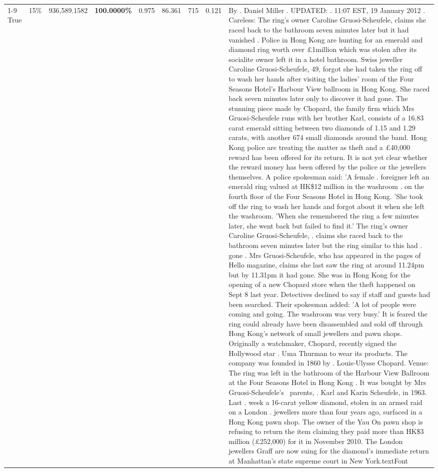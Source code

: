 \begin{table}[H]
\begin{tabular}{lllrlllll}
\cline{1-9} \cline{2-9}
True & 15\% & 936,589.1582 & \bfseries \color{red} 100.0000\% & 0.975 & 86.361 & 715 & 0.121 & By . Daniel Miller . UPDATED: . 11:07 EST, 19 January 2012 . Careless: The ring's owner Caroline Gruosi-Scheufele, claims she raced back to the bathroom seven minutes later but it had vanished . Police in Hong Kong are hunting for an emerald and diamond ring worth over £1million which was stolen after its socialite owner left it in a hotel bathroom. Swiss jeweller Caroline Gruosi-Scheufele, 49, forgot she had taken the ring off to wash her hands after visiting the ladies' room of the Four Seasons Hotel's Harbour View ballroom in Hong Kong. She raced back seven minutes later only to discover it had gone. The stunning piece made by Chopard, the family firm which Mrs Gruosi-Scheufele runs with her brother Karl, consists of a 16.83 carat emerald sitting between two diamonds of 1.15 and 1.29 carats, with another 674 small diamonds around the band. Hong Kong police are treating the matter as theft and a £40,000 reward has been offered for its return. It is not yet clear whether the reward money has been offered by the police or the jewellers themselves. A police spokesman said: 'A female . foreigner left an emerald ring valued at HK\$12 million in the washroom . on the fourth floor of the Four Seasons Hotel in Hong Kong. 'She took off the ring to wash her hands and forgot about it when she left the washroom. 'When she remembered the ring a few minutes later, she went back but failed to find it.' The ring's owner Caroline Gruosi-Scheufele, . claims she raced back to the bathroom seven minutes later but the ring similar to this had . gone . Mrs Gruosi-Scheufele, who has appeared in the pages of Hello magazine, claims she last saw the ring at around 11.24pm but by 11.31pm it had gone. She was in Hong Kong for the opening of a new Chopard store when the theft happened on Sept 8 last year. Detectives declined to say if staff and guests had been searched. Their spokesman added: 'A lot of people were coming and going. The washroom was very busy.' It is feared the ring could already have been disassembled and sold off through Hong Kong's network of small jewellers and pawn shops. Originally a watchmaker, Chopard, recently signed the Hollywood star . Uma Thurman to wear its products. The company was founded in 1860 by . Louis-Ulysse Chopard. Venue: The ring was left in the bathroom of the Harbour View Ballroom at the Four Seasons Hotel in Hong Kong . It was bought by Mrs Gruosi-Scheufele's  parents, . Karl and Karin Scheufele, in 1963. Last . week a 16-carat yellow diamond, stolen in an armed raid on a London . jewellers more than four years ago, surfaced in a Hong Kong pawn shop. The owner of the Yau On pawn shop is refusing to return the item claiming they paid more than HK\$3 million (£252,000) for it in November 2010. The London jewellers Graff are now suing for the diamond’s immediate return at Manhattan’s state supreme court in New York.textFont \\

\end{tabular}
\end{table}
